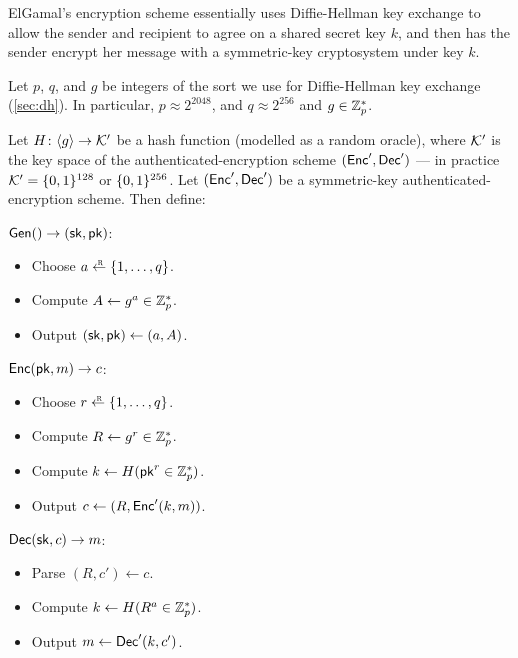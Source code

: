 ElGamal's encryption scheme essentially uses Diffie-Hellman key exchange to allow
the sender and recipient to agree on a shared secret key $k$, and then has
the sender encrypt her message with a symmetric-key cryptosystem under key $k$.

\begin{definition}
Let $p$, $q$, and $g$ be integers of the sort we use for Diffie-Hellman
key exchange (\cref{sec:dh}).
In particular, $p \approx 2^{2048}$, and $q \approx 2^{256}$
and $g \in \mathbb{Z}^*_p$.

Let $H \colon \langle g \rangle \to \mathcal{K}'$ be a hash function
(modelled as a random oracle), where $\mathcal{K}'$ is the key space of the
authenticated-encryption scheme $(\mathsf{Enc}', \mathsf{Dec}')$ --- in practice
$\mathcal{K}' = \{0,1\}^{128}$ or $\{0,1\}^{256}$.
Let $(\mathsf{Enc}', \mathsf{Dec}')$ 
be a symmetric-key authenticated-encryption scheme. Then define:

\begin{compactitem}
\item $\mathsf{Gen}() \to ({\mathsf{sk}}, \mathsf{pk})$:
    \begin{itemize}[noitemsep]
          \item Choose $a \getsr \{1, \dots, q\}$.
          \item Compute $A \gets g^a \in \mathbb{Z}^*_p$.
          \item Output $({\mathsf{sk}}, \mathsf{pk}) \gets (a, A)$.	
    \end{itemize}
  \item $\mathsf{Enc}(\mathsf{pk}, m) \to c$:
    \begin{itemize}[noitemsep]
      \item Choose $r \getsr \{1, \dots, q\}$.
      \item Compute $R \gets g^r \in \mathbb{Z}^*_p$.
      \item Compute $k \gets H(\mathsf{pk}^r \in \mathbb{Z}^*_p)$.
      \item Output $c \gets (R, \mathsf{Enc}'(k, m))$.
    \end{itemize}

  \item $\mathsf{Dec}({\mathsf{sk}}, c) \to m$:
    \begin{itemize}[noitemsep]
      \item Parse $(R, c') \gets c$.
      \item Compute $k \gets H(R^a \in \mathbb{Z}^*_p)$.
      \item Output $m \gets \mathsf{Dec}'(k, c')$.
    \end{itemize}
\end{compactitem}
\end{definition}

